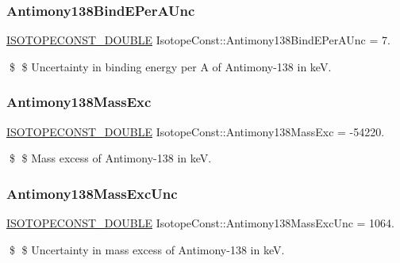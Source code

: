 \subsubsection{\texorpdfstring{Antimony138\+Bind\+E\+Per\+A\+Unc}{Antimony138BindEPerAUnc}}
{\footnotesize\ttfamily \mbox{\hyperlink{group___isotope_const-_macros_ga8f45a7272ce02c0b4c65c44636ed719a}{I\+S\+O\+T\+O\+P\+E\+C\+O\+N\+S\+T\+\_\+\+D\+O\+U\+B\+LE}} Isotope\+Const\+::\+Antimony138\+Bind\+E\+Per\+A\+Unc = 7.}

\$ \$ Uncertainty in binding energy per A of Antimony-\/138 in keV. \mbox{\label{group___isotope_const-_antimony-_sb138_gaa35330537093595265de0ea1a16d38dd}} 
\subsubsection{\texorpdfstring{Antimony138\+Mass\+Exc}{Antimony138MassExc}}
{\footnotesize\ttfamily \mbox{\hyperlink{group___isotope_const-_macros_ga8f45a7272ce02c0b4c65c44636ed719a}{I\+S\+O\+T\+O\+P\+E\+C\+O\+N\+S\+T\+\_\+\+D\+O\+U\+B\+LE}} Isotope\+Const\+::\+Antimony138\+Mass\+Exc = -\/54220.}

\$ \$ Mass excess of Antimony-\/138 in keV. \mbox{\label{group___isotope_const-_antimony-_sb138_ga8f3974f211291839156097a2b5e81195}} 
\subsubsection{\texorpdfstring{Antimony138\+Mass\+Exc\+Unc}{Antimony138MassExcUnc}}
{\footnotesize\ttfamily \mbox{\hyperlink{group___isotope_const-_macros_ga8f45a7272ce02c0b4c65c44636ed719a}{I\+S\+O\+T\+O\+P\+E\+C\+O\+N\+S\+T\+\_\+\+D\+O\+U\+B\+LE}} Isotope\+Const\+::\+Antimony138\+Mass\+Exc\+Unc = 1064.}

\$ \$ Uncertainty in mass excess of Antimony-\/138 in keV. \mbox{\label{group___isotope_const-_antimony-_sb138_ga26c862f11241eccc2178385d8d06d72e}} 
